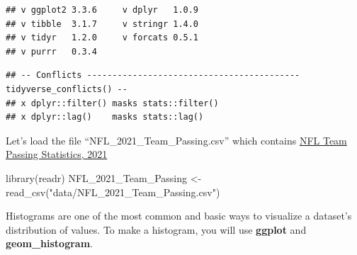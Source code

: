 \documentclass[
]{book}
\newenvironment{Shaded}{\begin{snugshade}}{\end{snugshade}}
\newcommand{\FunctionTok}[1]{\textcolor[rgb]{0.00,0.00,0.00}{#1}}
\newcommand{\NormalTok}[1]{#1}
\newcommand{\OtherTok}[1]{\textcolor[rgb]{0.56,0.35,0.01}{#1}}
\newcommand{\StringTok}[1]{\textcolor[rgb]{0.31,0.60,0.02}{#1}}
\theoremstyle{definition}
\theoremstyle{definition}
\theoremstyle{definition}
\theoremstyle{definition}
\theoremstyle{remark}
\begin{document}
\begin{verbatim}
## v ggplot2 3.3.6     v dplyr   1.0.9
## v tibble  3.1.7     v stringr 1.4.0
## v tidyr   1.2.0     v forcats 0.5.1
## v purrr   0.3.4
\end{verbatim}

\begin{verbatim}
## -- Conflicts ------------------------------------------ tidyverse_conflicts() --
## x dplyr::filter() masks stats::filter()
## x dplyr::lag()    masks stats::lag()
\end{verbatim}

Let's load the file ``NFL\_2021\_Team\_Passing.csv'' which contains \href{https://www.pro-football-reference.com/years/2021/index.htm\#passing}{NFL Team Passing Statistics, 2021}

\begin{Shaded}
\begin{Highlighting}[]
\FunctionTok{library}\NormalTok{(readr)}
\NormalTok{NFL\_2021\_Team\_Passing }\OtherTok{\textless{}{-}} \FunctionTok{read\_csv}\NormalTok{(}\StringTok{"data/NFL\_2021\_Team\_Passing.csv"}\NormalTok{)}
\end{Highlighting}
\end{Shaded}

Histograms are one of the most common and basic ways to visualize a dataset's distribution of values. To make a histogram, you will use \textbf{ggplot} and \textbf{geom\_histogram}.
\end{document}
